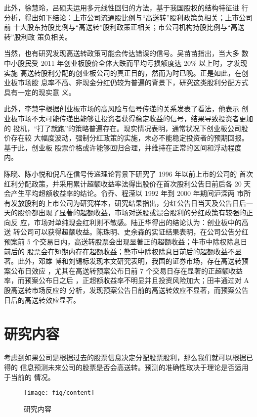 \documentclass[../main]{subfiles}
\begin{document}
此外，徐慧玲，吕硕夫运用多元线性回归的方法，基于我国股权的结构特征进
行分析，得出如下结论：上市公司流通股比例与“高送转”股利政策负相关；上市公司前
十大股东持股比例与“高送转”股利政策正相关；市公司机构持股比例与“高送转”股利政
策负相关。

当然，也有研究发现高送转政策可能会传达错误的信号。吴苗苗指出，当大多
数中小股民受 2011 年创业板股价全体大跌而平均亏损额度达 20\% 以上时，才发现实施
高送转股利分配的创业板公司的真正目的，然而为时已晚。正是如此，在创业板市场股
息率不高、非现金分红仍较为普遍的背景下，研究这类股利分配方式具有一定的现实意
义。

此外，李慧宇根据创业板市场的高风险与信号传递的关系发表了看法，他表示
创业板市场不太可能传递出能够让投资者获得稳定收益的信号，结果导致投资者更加的
投机，“打了就跑”的策略普遍存在。现实情况表明，通常状况下创业板公司股价存在较
大幅度波动，强制分红政策的实施，未必不能稳定投资者的预期回报。基于此，创业板
股票价格或许能够回归合理，并维持在正常的区间和浮动程度内。

陈晓、陈小悦和倪凡在信号传递理论背景下研究了 1996 年以前上市的公司的
首次红利分配政策，并采用累计超额收益率法得出股价在首次股利公告日前后各 20 天
会产生平均超额收益率的结论。俞乔、程滢以 1992 年到 2000 年期间沪深两
市所有发放股利的上市公司为研究样本，研究结果指出，分红公告日当天及公告日后一
天的股价都出现了显著的超额收益，市场对送股或混合股利的分红政策有较强的正向反
应，市场对单纯现金红利则不敏感。陆正华得出的结论认为：创业板中的高送
转公司可以获得超额收益。陈珠明、史余森的实证结果表明，在公司公告分红
预案前 5 个交易日内，高送转股票会出现显著正的超额收益；牛市中除权除息日前后的
股票会在短期内存在超额收益；熊市中除权除息日前后的超额收益不显著。此外，邓雄
博和刘锡标发现本文研究表明，我国的证券市场，存在高送转预案公布日效应
，尤其在高送转预案公布日前 7 个交易日存在显著的正超额收益率，而预案公布日之后
，正超额收益率不明显并且投资风险加大；田丰通过对 A 股高送转市场反应的
分析，发现预案公告日前的高送转效应不显著，而预案公告日后的高送转效应显著。

\section{研究内容}%
\label{sec:content}

考虑到如果公司是根据过去的股票信息决定分配股票股利，那么我们就可以根据已得的
信息预测未来公司的股票是否会高送转。预测的准确性取决于理论是否适用于当前的
情况。

\begin{figure}[htbp]
  \centering
  \texttt{[image: fig/content]}
  \caption{研究内容}%
  \label{fig:content}
\end{figure}
\end{document}

